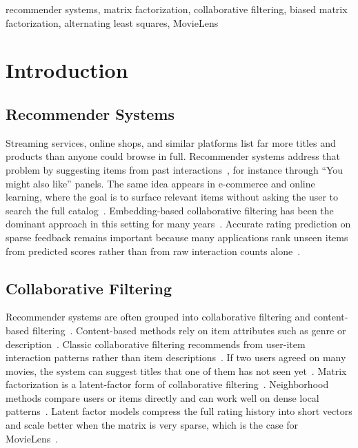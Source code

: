 \documentclass[conference]{IEEEtran}
\begin{document}
\begin{IEEEkeywords}
recommender systems, matrix factorization, collaborative filtering, biased matrix factorization, alternating least squares, MovieLens
\end{IEEEkeywords}

\section{Introduction}

\subsection{Recommender Systems}

Streaming services, online shops, and similar platforms list far more titles and products than anyone could browse in full. Recommender systems address that problem by suggesting items from past interactions~\cite{ref4}, for instance through ``You might also like'' panels. The same idea appears in e-commerce and online learning, where the goal is to surface relevant items without asking the user to search the full catalog~\cite{ref5,ref1}. Embedding-based collaborative filtering has been the dominant approach in this setting for many years~\cite{ref6}. Accurate rating prediction on sparse feedback remains important because many applications rank unseen items from predicted scores rather than from raw interaction counts alone~\cite{ref3,ref4}.

\subsection{Collaborative Filtering}

Recommender systems are often grouped into collaborative filtering and content-based filtering~\cite{ref4}. Content-based methods rely on item attributes such as genre or description~\cite{ref4}. Classic collaborative filtering recommends from user-item interaction patterns rather than item descriptions~\cite{ref4}. If two users agreed on many movies, the system can suggest titles that one of them has not seen yet~\cite{ref4}. Matrix factorization is a latent-factor form of collaborative filtering~\cite{ref3,ref2}. Neighborhood methods compare users or items directly and can work well on dense local patterns~\cite{ref3}. Latent factor models compress the full rating history into short vectors and scale better when the matrix is very sparse, which is the case for MovieLens~\cite{ref2,ref1}.
\end{document}

